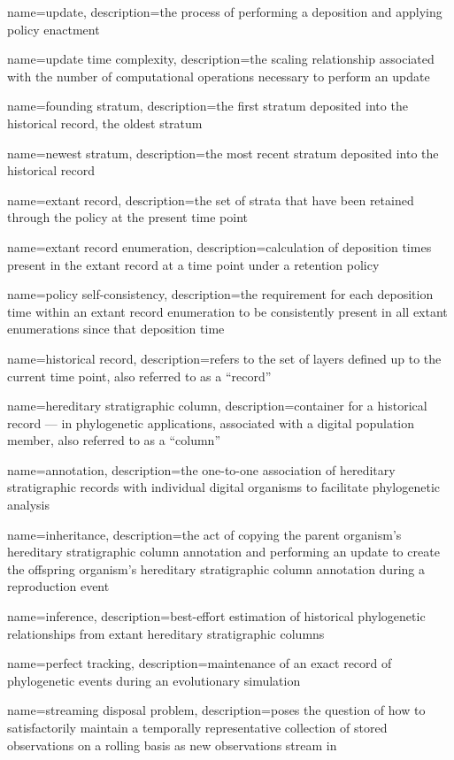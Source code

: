 {
    name=update,
    description={the process of performing a deposition and applying policy enactment}
}

{
    name=update time complexity,
    description={the scaling relationship associated with the number of computational operations necessary to perform an update}
}

{
    name=founding stratum,
    description={the first stratum deposited into the historical record, the oldest stratum}
}

{
    name=newest stratum,
    description={the most recent stratum deposited into the historical record}
}

{
    name=extant record,
    description={the set of strata that have been retained through the policy at the present time point}
}

{
    name=extant record enumeration,
    description={calculation of deposition times present in the extant record at a time point under a retention policy}
}

{
    name=policy self-consistency,
    description={the requirement for each deposition time within an extant record enumeration to be consistently present in all extant enumerations since that deposition time}
}

{
    name=historical record,
    description={refers to the set of layers defined up to the current time point, also referred to as a ``record''}
}

{
    name=hereditary stratigraphic column,
    description={container for a historical record --- in phylogenetic applications, associated with a digital population member, also referred to as a ``column''}
}

{
    name=annotation,
    description={the one-to-one association of hereditary stratigraphic records with individual digital organisms to facilitate phylogenetic analysis}
}

{
    name=inheritance,
    description={the act of copying the parent organism's hereditary stratigraphic column annotation and performing an update to create the offspring organism's hereditary stratigraphic column annotation during a reproduction event}
}

{
    name=inference,
    description={best-effort estimation of historical phylogenetic relationships from extant hereditary stratigraphic columns}
}

{
    name=perfect tracking,
    description={maintenance of an exact record of phylogenetic events during an evolutionary simulation}
}

{
    name=streaming disposal problem,
    description={poses the question of how to satisfactorily maintain a temporally representative collection of stored observations on a rolling basis as new observations stream in}
}

